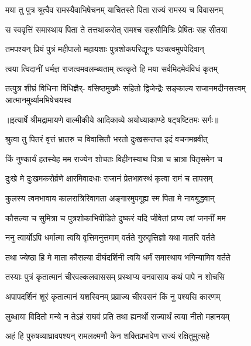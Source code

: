 \twolineshloka
{मया तु पुत्र श्रुत्वैव रामस्यैवाभिषेचनम्}
{याचितस्ते पिता राज्यं रामस्य च विवासनम्} %

\twolineshloka
{स स्ववृत्तिं समास्थाय पिता ते तत्तथाकरोत्}
{रामश्च सहसौमित्रिः प्रेषितः सह सीतया} %

\twolineshloka
{तमपश्यन् प्रियं पुत्रं महीपालो महायशाः}
{पुत्रशोकपरिद्यूनः पञ्चत्वमुपपेदिवान्} %

\twolineshloka
{त्वया त्विदानीं धर्मज्ञ राजत्वमवलम्ब्यताम्}
{त्वत्कृते हि मया सर्वमिदमेवंविधं कृतम्} %

\fourlineindentedshloka
{तत्पुत्र शीघ्रं विधिना विधिज्ञैर्-}
{वसिष्ठमुख्यैः सहितो द्विजेन्द्रैः}
{सङ्काल्य राजानमदीनसत्त्वम्}
{आत्मानमुर्व्यामभिषेचयस्व} %


{॥इत्यार्षे श्रीमद्रामायणे वाल्मीकीये आदिकाव्ये अयोध्याकाण्डे षट्षष्टितमः सर्गः॥}


\twolineshloka
{श्रुत्वा तु पितरं वृत्तं भ्रातरु च विवासितौ}
{भरतो दुःखसन्तप्त इदं वचनमब्रवीत्} %

\twolineshloka
{किं नुण्कार्यं हतस्येह मम राज्येन शोचतः}
{विहीनस्याथ पित्रा च भ्रात्रा पितृसमेन च} %

\twolineshloka
{दुःखे मे दुःखमकरोर्व्रणे क्षारमिवादधाः}
{राजानं प्रेतभावस्थं कृत्वा रामं च तापसम्} %

\twolineshloka
{कुलस्य त्वमभावाय कालरात्रिरिवागता}
{अङ्गारमुपगूह्य स्म पिता मे नावबुद्धवान्} %

\twolineshloka
{कौसल्या च सुमित्रा च पुत्रशोकाभिपीडिते}
{दुष्करं यदि जीवेतां प्राप्य त्वां जननीं मम} %

\twolineshloka
{ननु त्वार्योऽपि धर्मात्मा त्वयि वृत्तिमनुत्तमाम्}
{वर्तते गुरुवृत्तिज्ञो यथा मातरि वर्तते} %

\twolineshloka
{तथा ज्येष्ठा हि मे माता कौसल्या दीर्घदर्शिनी}
{त्वयि धर्मं समास्थाय भगिन्यामिव वर्तते} %

\twolineshloka
{तस्याः पुत्रं कृतात्मानं चीरवल्कलवाससम्}
{प्रस्थाप्य वनवासाय कथं पापे न शोचसि} %

\twolineshloka
{अपापदर्शिनं शूरं कृतात्मानं यशस्विनम्}
{प्रव्राज्य चीरवसनं किं नु पश्यसि कारणम्} %

\twolineshloka
{लुब्धाया विदितो मन्ये न तेऽहं राघवं प्रति}
{तथा ह्यनर्थो राज्यार्थं त्वया नीतो महानयम्} %

\twolineshloka
{अहं हि पुरुषव्याघ्रावपश्यन् रामलक्ष्मणौ}
{केन शक्तिप्रभावेण राज्यं रक्षितुमुत्सहे} %

